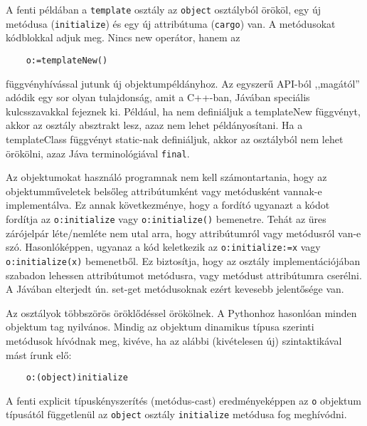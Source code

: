 A  fenti példában
a \verb!template! osztály az \verb!object! osztályból örököl,
egy új metódusa (\verb!initialize!) és egy új attribútuma (\verb!cargo!) van.
A metódusokat kódblokkal adjuk meg.
Nincs new operátor, hanem az 
\begin{verbatim}
    o:=templateNew()
\end{verbatim}
függvényhívással jutunk új objektumpéldányhoz. Az egyszerű
API-ból ,,magától'' adódik egy sor olyan tulajdonság,
amit a C++-ban, Jávában speciális kulcsszavakkal fejeznek ki. 
Például, ha nem definiáljuk a templateNew függvényt,
akkor az osztály absztrakt lesz, azaz nem lehet példányosítani.
Ha a templateClass függvényt static-nak definiáljuk, 
akkor az osztályból nem lehet örökölni, 
azaz Jáva terminológiával \verb!final!.


Az objektumokat használó programnak nem kell számontartania,
hogy az objektumműveletek belsőleg attribútumként vagy metódusként
vannak-e implementálva. Ez annak következménye, hogy a fordító 
ugyanazt a kódot fordítja az \verb!o:initialize! vagy \verb!o:initialize()!
bemenetre. Tehát az üres zárójelpár léte/nemléte nem utal arra,
hogy attribútumról vagy metódusról van-e szó.
Hasonlóképpen, ugyanaz a kód keletkezik az \verb!o:initialize:=x! 
vagy \verb!o:initialize(x)! bemenetből. Ez biztosítja,
hogy az osztály implementációjában szabadon lehessen attribútumot metódusra,
vagy metódust attribútumra cserélni. A Jávában
elterjedt ún. set-get metódusoknak ezért kevesebb jelentősége van.

Az osztályok többszörös öröklődéssel örökölnek. 
A Pythonhoz hasonlóan minden objektum tag nyilvános.
Mindig az objektum dinamikus típusa szerinti metódusok hívódnak meg,
kivéve, ha az alábbi (kivételesen új) szintaktikával mást írunk elő:
\begin{verbatim}
    o:(object)initialize
\end{verbatim}
A fenti explicit típuskényszerítés (metódus-cast) eredményeképpen 
az \verb!o! objektum típusától  függetlenül az \verb!object! osztály 
\verb!initialize! metódusa fog meghívódni.

